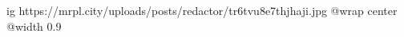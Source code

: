  
 
 
 
 

\ifcmt
  ig https://mrpl.city/uploads/posts/redactor/tr6tvu8e7thjhaji.jpg
  @wrap center
  @width 0.9
\fi
